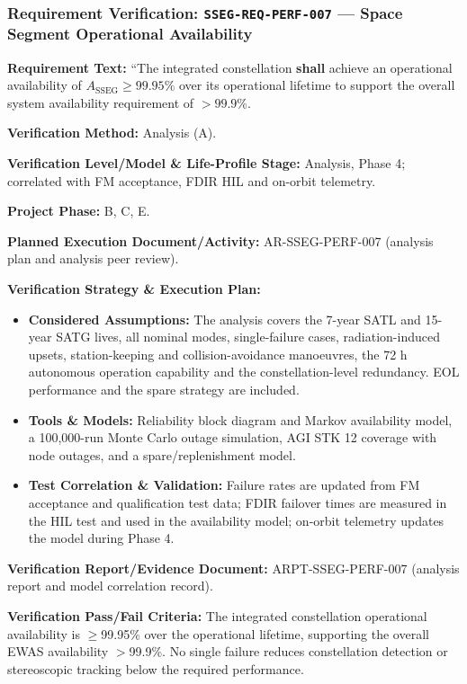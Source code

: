 \subsubsection{Requirement Verification: \texttt{SSEG-REQ-PERF-007} --- Space Segment Operational Availability}
\label{ver:SSEG-REQ-PERF-007}
\textbf{Requirement Text:} ``The integrated  constellation \textbf{shall} achieve an operational availability of $A_{\text{SSEG}} \ge 99.95\%$ over its operational lifetime to support the overall  system availability requirement of $> 99.9\%$.
\par\textbf{Verification Method:} Analysis (A).
\par\textbf{Verification Level/Model \& Life-Profile Stage:} Analysis, Phase 4; correlated with FM acceptance, FDIR HIL and on-orbit telemetry.
\par\textbf{Project Phase:} B, C, E.
\par\textbf{Planned Execution Document/Activity:} AR-SSEG-PERF-007 (analysis plan and analysis peer review).
\par\textbf{Verification Strategy \& Execution Plan:}
\begin{itemize}
\item \textbf{Considered Assumptions:} The analysis covers the 7-year SATL and 15-year SATG lives, all nominal modes, single-failure cases, radiation-induced upsets, station-keeping and collision-avoidance manoeuvres, the 72 h autonomous operation capability and the constellation-level redundancy. EOL performance and the spare strategy are included.
\item \textbf{Tools \& Models:} Reliability block diagram and Markov availability model, a 100,000-run Monte Carlo outage simulation, AGI STK 12 coverage with node outages, and a spare/replenishment model.
\item \textbf{Test Correlation \& Validation:} Failure rates are updated from FM acceptance and qualification test data; FDIR failover times are measured in the HIL test and used in the availability model; on-orbit telemetry updates the model during Phase 4.
\end{itemize}
\par\textbf{Verification Report/Evidence Document:} ARPT-SSEG-PERF-007 (analysis report and model correlation record).
\par\textbf{Verification Pass/Fail Criteria:} The integrated constellation operational availability is $\ge$99.95\% over the operational lifetime, supporting the overall EWAS availability $>$99.9\%. No single failure reduces constellation detection or stereoscopic tracking below the required performance.
\par\medskip
